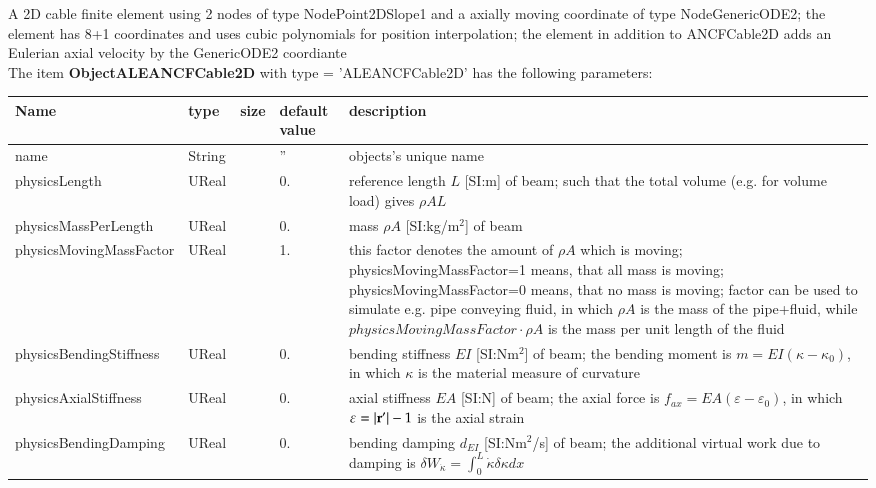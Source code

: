 A 2D cable finite element using 2 nodes of type NodePoint2DSlope1 and a axially moving coordinate of type NodeGenericODE2; the element has 8+1 coordinates and uses cubic polynomials for position interpolation; the element in addition to ANCFCable2D adds an Eulerian axial velocity by the GenericODE2 coordiante
 \\\vspace{12pt} \noindent The item {\bf ObjectALEANCFCable2D} with type = 'ALEANCFCable2D' has the following parameters:\vspace{-1cm}\\ 
\begin{center}
  \footnotesize
  \begin{longtable}{| p{4.5cm} | p{2.5cm} | p{0.5cm} | p{2.5cm} | p{6cm} |}
    \hline
    \bf Name & \bf type & \bf size & \bf default value & \bf description \\ \hline
    name &     String &      &     '' &     objects's unique name\\ \hline
    physicsLength &     UReal &      &     0. &     reference length $L$ [SI:m] of beam; such that the total volume (e.g. for volume load) gives $\rho A L$\\ \hline
    physicsMassPerLength &     UReal &      &     0. &     mass $\rho A$ [SI:kg/m$^2$] of beam\\ \hline
    physicsMovingMassFactor &     UReal &      &     1. &     this factor denotes the amount of $\rho A$ which is moving; physicsMovingMassFactor=1 means, that all mass is moving; physicsMovingMassFactor=0 means, that no mass is moving; factor can be used to simulate e.g. pipe conveying fluid, in which $\rho A$ is the mass of the pipe+fluid, while $physicsMovingMassFactor \cdot \rho A$ is the mass per unit length of the fluid\\ \hline
    physicsBendingStiffness &     UReal &      &     0. &     bending stiffness $EI$ [SI:Nm$^2$] of beam; the bending moment is $m = EI (\kappa - \kappa_0)$, in which $\kappa$ is the material measure of curvature\\ \hline
    physicsAxialStiffness &     UReal &      &     0. &     axial stiffness $EA$ [SI:N] of beam; the axial force is $f_{ax} = EA (\varepsilon -\varepsilon_0)$, in which $\varepsilon = |\mathbf{r}^\prime|-1$ is the axial strain\\ \hline
    physicsBendingDamping &     UReal &      &     0. &     bending damping $d_{EI}$ [SI:Nm$^2$/s] of beam; the additional virtual work due to damping is $\delta W_{\dot \kappa} = \int_0^L \dot \kappa \delta \kappa dx$\\ \hline

\end{longtable}
\end{center}
